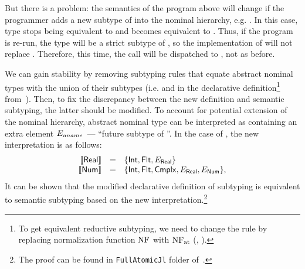 But there is a problem: %
the semantics of the program above will change
if the programmer adds a new subtype of  
into the nominal hierarchy, e.g. .
In this case, type 
stops being equivalent to 
and becomes equivalent to .
Thus, if the program is re-run, the type  
will be a strict subtype of ,
so the implementation of  will not replace . 
Therefore, this time, the call  
will be dispatched to , not  as before.

We can gain stability by removing subtyping rules that 
equate abstract nominal types with the union of their subtypes
(i.e.  and  
in the declarative definition\footnote{To get 
	equivalent reductive subtyping, we need to change 
    the  rule by replacing normalization function $\mathop{\mathrm{NF}}$ with $\mathop{\mathrm{NF}_{\mathrm{at}}}$ 
    (, ).}
from~).
Then, to fix the discrepancy between the new definition 
and semantic subtyping, the latter should be modified. 
To account for potential extension of the nominal hierarchy,
abstract nominal type \aname can be interpreted 
as containing an extra element $E_\mathit{aname}$~--- ``future subtype of \aname''.
In the case of \BetaJulia, the new interpretation is as follows:
\[
\begin{array}{rcl}
\llbracket \mathsf{Real} \rrbracket & = & \{ \mathsf{Int}, \mathsf{Flt}, E_{\mathsf{Real}} \} \\
\llbracket \mathsf{Num} \rrbracket & = & \{ \mathsf{Int}, \mathsf{Flt}, \mathsf{Cmplx},
                           E_{\mathsf{Real}}, E_{\mathsf{Num}} \},
\end{array}
\]
It can be shown that
the modified declarative definition of subtyping
is equivalent to semantic subtyping 
based on the new interpretation.\footnote{The proof can be found 
	in \texttt{FullAtomicJl} folder of~\cite{bib:MiniJlCoq}.}
